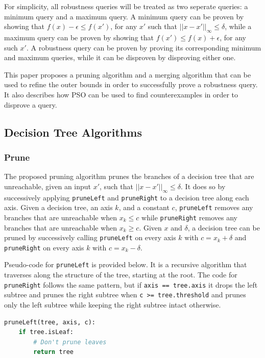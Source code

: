 \documentclass[pageno]{jpaper}
\begin{document}
\begin{doublespacing}
For simplicity, all robustness queries will be treated as two seperate queries: a minimum query and a maximum query. A minimum query can be proven by showing that $f(x) - \epsilon \le f(x')$, for any $x'$ such that $||x - x'||_\infty \le \delta$, while a maximum query can be proven by showing that $f(x') \le f(x) + \epsilon$, for any such $x'$. A robustness query can be proven by proving its corresponding minimum and maximum queries, while it can be disproven by disproving either one.

This paper proposes a pruning algorithm and a merging algorithm that can be used to refine the outer bounds in order to successfully prove a robustness query. It also describes how PSO can be used to find counterexamples in order to disprove a query.

\subsection{Decision Tree Algorithms}
\label{sec:algorithms}
\subsubsection{Prune}
The proposed pruning algorithm prunes the branches of a decision tree that are unreachable, given an input $x'$, such that $||x - x'||_\infty \le \delta$. It does so by successively applying \verb|pruneLeft| and \verb|pruneRight| to a decision tree along each axis. Given a decision tree, an axis $k$, and a constant $c$, \verb|pruneLeft| removes any branches that are unreachable when $x_k \le c$ while \verb|pruneRight| removes any branches that are unreachable when $x_k \ge c$. Given $x$ and $\delta$, a decision tree can be pruned by successively calling \verb|pruneLeft| on every axis $k$ with $c = x_k + \delta$ and \verb|pruneRight| on every axis $k$ with $c = x_k - \delta$. 

Pseudo-code for \verb|pruneLeft| is provided below. It is a recursive algorithm that traverses along the structure of the tree, starting at the root. The code for \verb|pruneRight| follows the same pattern, but if \verb|axis == tree.axis| it drops the left subtree and prunes the right subtree when \verb|c >= tree.threshold| and prunes only the left subtree while keeping the right subtree intact otherwise.

{\singlespacing
\begin{lstlisting}[language=Python, caption=pruneLeft algorithm]
pruneLeft(tree, axis, c):
	if tree.isLeaf:
		# Don't prune leaves
		return tree


\end{lstlisting}}
\end{doublespacing}
\end{document}
